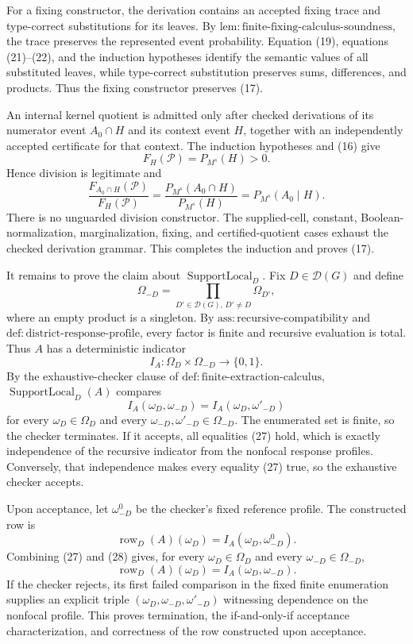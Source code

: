 For a fixing constructor, the derivation contains an accepted fixing trace and type-correct substitutions for its leaves.  By \(\mathrm{lem:finite\text{-}fixing\text{-}calculus\text{-}soundness}\), the trace preserves the represented event probability.  Equation (19), equations (21)--(22), and the induction hypotheses identify the semantic values of all substituted leaves, while type-correct substitution preserves sums, differences, and products.  Thus the fixing constructor preserves (17).

An internal kernel quotient is admitted only after checked derivations of its numerator event \(A_0\cap H\) and its context event \(H\), together with an independently accepted certificate for that context.  The induction hypotheses and (16) give
\[
 F_H(\mathcal P)=P_{M^s}(H)>0.
\tag{23}
\]
Hence division is legitimate and
\[
 \frac{F_{A_0\cap H}(\mathcal P)}{F_H(\mathcal P)}
 =\frac{P_{M^s}(A_0\cap H)}{P_{M^s}(H)}
 =P_{M^s}(A_0\mid H).
\tag{24}
\]
There is no unguarded division constructor.  The supplied-cell, constant, Boolean-normalization, marginalization, fixing, and certified-quotient cases exhaust the checked derivation grammar.  This completes the induction and proves (17).

It remains to prove the claim about \(\operatorname{SupportLocal}_D\).  Fix \(D\in\mathcal D(G)\) and define
\[
 \Omega_{-D}
 =\prod_{D'\in\mathcal D(G),\,D'\ne D}\Omega_{D'},
\tag{25}
\]
where an empty product is a singleton.  By \(\mathrm{ass:recursive\text{-}compatibility}\) and \(\mathrm{def:district\text{-}response\text{-}profile}\), every factor is finite and recursive evaluation is total.  Thus \(A\) has a deterministic indicator
\[
 I_A:\Omega_D\times\Omega_{-D}\longrightarrow\{0,1\}.
\tag{26}
\]
By the exhaustive-checker clause of \(\mathrm{def:finite\text{-}extraction\text{-}calculus}\), \(\operatorname{SupportLocal}_D(A)\) compares
\[
 I_A(\omega_D,\omega_{-D})
 =I_A(\omega_D,\omega'_{-D})
\tag{27}
\]
for every \(\omega_D\in\Omega_D\) and every \(\omega_{-D},\omega'_{-D}\in\Omega_{-D}\).  The enumerated set is finite, so the checker terminates.  If it accepts, all equalities (27) hold, which is exactly independence of the recursive indicator from the nonfocal response profiles.  Conversely, that independence makes every equality (27) true, so the exhaustive checker accepts.

Upon acceptance, let \(\omega_{-D}^{0}\) be the checker's fixed reference profile.  The constructed row is
\[
 \operatorname{row}_D(A)(\omega_D)
 =I_A(\omega_D,\omega_{-D}^{0}).
\tag{28}
\]
Combining (27) and (28) gives, for every \(\omega_D\in\Omega_D\) and every \(\omega_{-D}\in\Omega_{-D}\),
\[
 \operatorname{row}_D(A)(\omega_D)
 =I_A(\omega_D,\omega_{-D}).
\]
If the checker rejects, its first failed comparison in the fixed finite enumeration supplies an explicit triple \((\omega_D,\omega_{-D},\omega'_{-D})\) witnessing dependence on the nonfocal profile.  This proves termination, the if-and-only-if acceptance characterization, and correctness of the row constructed upon acceptance.